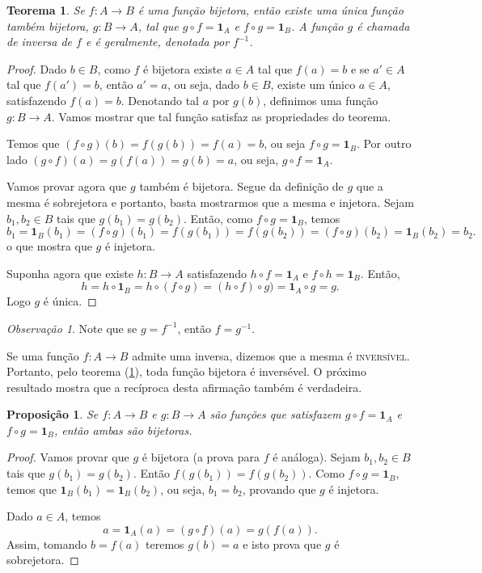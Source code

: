 \documentclass[a4paper,12pt]{monografia}
\theoremstyle{plain}
\newtheorem{theorem}{Teorema}[section]
\newtheorem{proposition}{Proposição}[section]
\theoremstyle{definition}
\theoremstyle{remark}
\newtheorem{remark}{Observação}[section]
\newcommand{\id}{\mathbf{1}}
\begin{document}
\begin{theorem}\label{inversa-func}
Se $f:A \rightarrow B$ é uma função bijetora, então existe uma
única função também bijetora, $g:B \rightarrow A$, tal que $g
\circ f = \id_A$ e $f \circ g = \id_B$. A função $g$ é chamada de
inversa de $f$ e é geralmente, denotada por $f^{-1}$.
\end{theorem}
\begin{proof}
Dado $b \in B$, como $f$ é bijetora existe $a \in A$ tal que
$f(a)=b$ e se $a' \in A$ tal que $f(a')=b$, então $a'=a$, ou seja,
dado $b \in B$, existe um único $a \in A$, satisfazendo $f(a)=b$.
Denotando tal $a$ por $g(b)$, definimos uma função $g:B
\rightarrow A$. Vamos mostrar que tal função satisfaz as
propriedades do teorema.

Temos que $(f \circ g)(b)=f(g(b))=f(a)=b$, ou seja $f \circ
g=\id_B$. Por outro lado $(g \circ f)(a)=g(f(a))=g(b)=a$, ou seja,
$g \circ f=\id_A$.

Vamos provar agora que $g$ também é bijetora. Segue da definição
de $g$ que a mesma é sobrejetora e portanto, basta mostrarmos que
a mesma e injetora. Sejam $b_1,b_2 \in B$ tais que
$g(b_1)=g(b_2)$. Então, como $f \circ g=\id_B$, temos
$$
b_1=\id_B(b_1)=(f \circ g)(b_1)=f(g(b_1))=f(g(b_2))=(f \circ
g)(b_2)=\id_B(b_2)=b_2.
$$
o que mostra que $g$ é injetora.

Suponha agora que existe $h:B \rightarrow A$ satisfazendo $h \circ
f = \id_A$ e $f \circ h = \id_B$. Então,
$$
h=h \circ \id_B= h \circ (f \circ g)= (h \circ f) \circ g)=\id_A
\circ g= g.
$$
Logo $g$ é única.
\end{proof}
\begin{remark}
Note que se $g=f^{-1}$, então $f=g^{-1}$.
\end{remark}

Se uma função $f:A \rightarrow B$ admite uma inversa, dizemos que
a mesma é \textsc{inversível}. Portanto, pelo teorema
(\ref{inversa-func}), toda função bijetora é inversével. O próximo
resultado mostra que a recíproca desta afirmação também é
verdadeira.

\begin{proposition}\label{comp-bije}
Se $f:A \rightarrow B$ e $g:B \rightarrow A$ são funções que
satisfazem $g \circ f = \id_A$ e $f \circ g = \id_B$, então ambas
são bijetoras.
\end{proposition}
\begin{proof}
Vamos provar que $g$ é bijetora (a prova para $f$ é análoga).
Sejam $b_1, b_2 \in B$ tais que $g(b_1)=g(b_2)$. Então
$f(g(b_1))=f(g(b_2))$. Como $f \circ g = \id_B$, temos que
$\id_B(b_1)=\id_B(b_2)$, ou seja, $b_1=b_2$, provando que $g$ é
injetora.

Dado $a \in A$, temos
$$
a=\id_A(a)=(g \circ f)(a)=g(f(a)).
$$
Assim, tomando $b=f(a)$ teremos $g(b)=a$ e isto prova que $g$ é
sobrejetora.
\end{proof}



\singlespacing



\end{document}
